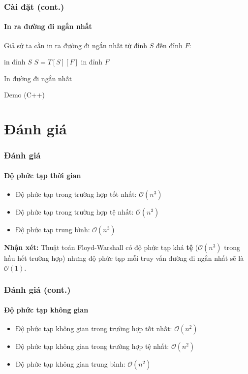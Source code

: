 \documentclass[12pt]{beamer}
\begin{document}
    \begin{frame}
        \frametitle{Cài đặt (cont.)}
        \framesubtitle{In ra đường đi ngắn nhất}
        Giả sử ta cần in ra đường đi ngắn nhất từ đỉnh $S$ đến đỉnh $F$:
        \begin{algorithm}[H]
            \begin{algorithmic}[1]
                \STATE in đỉnh $S$
                \STATE $S = T[S][F]$
                \ENDWHILE
                \STATE in đỉnh $F$
            \end{algorithmic}
            \caption{In đường đi ngắn nhất}
        \end{algorithm}
    \end{frame}
    \begin{frame}
        \Large \centering
        Demo (C++)
    \end{frame}


    \section{Đánh giá}
    \begin{frame}
        \frametitle{Đánh giá}
        \framesubtitle{Độ phức tạp thời gian}
        \begin{itemize}
            \item Độ phức tạp trong trường hợp tốt nhất: $\mathcal{O}(n^3)$
            \item Độ phức tạp trong trường hợp tệ nhất: $\mathcal{O}(n^3)$
            \item Độ phức tạp trung bình: $\mathcal{O}(n^3)$
        \end{itemize}\pause
        \textbf{Nhận xét:} Thuật toán Floyd-Warshall có độ phức tạp khá \textbf{tệ} ($\mathcal{O}(n^3)$ trong hầu hết trường hợp) nhưng độ phức tạp mỗi truy vấn đường đi ngắn nhất sẽ là $\mathcal{O}(1)$.
    \end{frame}

    \begin{frame}
        \frametitle{Đánh giá (cont.)}
        \framesubtitle{Độ phức tạp không gian}
        \begin{itemize}
            \item Độ phức tạp không gian trong trường hợp tốt nhất: $\mathcal{O}(n^2)$
            \item Độ phức tạp không gian trong trường hợp tệ nhất: $\mathcal{O}(n^2)$
            \item Độ phức tạp không gian trung bình: $\mathcal{O}(n^2)$
        \end{itemize}
    \end{frame}
\end{document}
